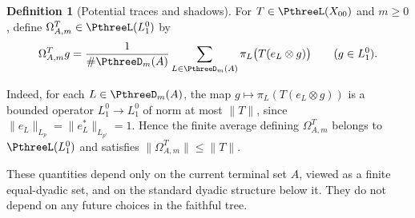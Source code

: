 \documentclass[11pt,reqno]{amsart}
\makeatletter
\theoremstyle{plain}
\theoremstyle{definition}
\newtheorem{definition}[definition]{Definition}
\newcounter{problempaper}
\newenvironment{problempaperbody}{%
  \setcounter{subsection}{0}%
  \setcounter{subsubsection}{0}%
  \setcounter{paragraph}{0}%
  \renewcommand{\thesubsection}{\arabic{subsection}}%
  \renewcommand{\thesubsubsection}{\thesubsection.\arabic{subsubsection}}%
  \renewcommand{\theparagraph}{\thesubsubsection.\arabic{paragraph}}%
  \let\problem@outersection\section
  \let\problem@outersubsection\subsection
  \let\problem@outersubsubsection\subsubsection
  \let\problem@outerparagraph\paragraph
  \let\section\problem@papersection
  \let\subsection\problem@papersubsection
  \let\subsubsection\problem@papersubsubsection
}{%
  \let\section\problem@outersection
  \let\subsection\problem@outersubsection
  \let\subsubsection\problem@outersubsubsection
  \let\paragraph\problem@outerparagraph
}
\newcommand{\problem@target}[2]{%
  \hypertarget{problem-\theproblempaper-#1-#2}{}%
}
\newcommand{\problem@paperheading}[3]{%
  \par\bigskip
  \problem@target{#1}{#2}%
  \noindent{\large\bfseries #2.\quad #3\par}%
  \nobreak\smallskip
}
\newcommand{\problem@papersubheading}[3]{%
  \par\medskip
  \problem@target{#1}{#2}%
  \noindent{\normalsize\bfseries #2.\quad #3\par}%
  \nobreak\smallskip
}
\newcommand{\problem@papersubsubheading}[3]{%
  \par\smallskip
  \problem@target{#1}{#2}%
  \noindent{\normalsize\itshape #2.\quad #3.\ }%
}
\def\problem@papersection{%
  \@ifstar{\problem@papersectionstar}{\problem@papersectionnostar}%
}
\def\problem@papersectionstar#1{%
  \par\bigskip\noindent{\large\bfseries #1\par}\nobreak\smallskip
}
\def\problem@papersectionnostar#1{%
  \refstepcounter{subsection}%
  \setcounter{subsubsection}{0}%
  \setcounter{paragraph}{0}%
  \problem@paperheading{section}{\thesubsection}{#1}%
  \problem@writecontentsline{section}{\thesubsection}{#1}%
}
\def\problem@papersubsection{%
  \@ifstar{\problem@papersubsectionstar}{\problem@papersubsectionnostar}%
}
\def\problem@papersubsectionstar#1{%
  \par\medskip\noindent{\normalsize\bfseries #1\par}\nobreak\smallskip
}
\def\problem@papersubsectionnostar#1{%
  \refstepcounter{subsubsection}%
  \setcounter{paragraph}{0}%
  \problem@papersubheading{subsection}{\thesubsubsection}{#1}%
  \problem@writecontentsline{subsection}{\thesubsubsection}{#1}%
}
\def\problem@papersubsubsection{%
  \@ifstar{\problem@papersubsubsectionstar}{\problem@papersubsubsectionnostar}%
}
\def\problem@papersubsubsectionstar#1{%
  \par\smallskip\noindent{\normalsize\itshape #1.\ }%
}
\def\problem@papersubsubsectionnostar#1{%
  \refstepcounter{paragraph}%
  \problem@papersubsubheading{subsubsection}{\theparagraph}{#1}%
  \problem@writecontentsline{subsubsection}{\theparagraph}{#1}%
}
\newcommand{\problem@writecontentsline}[3]{%
  \begingroup
  \protected@write\@auxout{}{%
    \string\problemcontentsentry{\theproblempaper}{#1}{#2}{#3}{\thepage}%
  }%
  \endgroup
}
\newcommand{\problemcontentsentry}[5]{%
  \@ifundefined{problemcontents@#1}{%
    \expandafter\gdef\csname problemcontents@#1\endcsname{}%
  }{}%
  \expandafter\g@addto@macro\csname problemcontents@#1\endcsname{%
    \problemcontentsline{#1}{#2}{#3}{#4}{#5}%
  }%
}
\newcommand{\problemcontentslink}[4]{%
  \hyperlink{problem-#1-#2-#3}{#4}%
}
\newcommand{\problemcontentsline}[5]{%
  \ifstrequal{#2}{section}{%
    \par\noindent
    \problemcontentslink{#1}{#2}{#3}{\makebox[2.5em][l]{#3}#4}%
    \nobreak\dotfill
    \problemcontentslink{#1}{#2}{#3}{#5}\par
  }{%
    \ifstrequal{#2}{subsection}{%
      \par\noindent\hspace*{1.5em}%
      \problemcontentslink{#1}{#2}{#3}{\makebox[3.5em][l]{#3}#4}%
      \nobreak\dotfill
      \problemcontentslink{#1}{#2}{#3}{#5}\par
    }{%
      \par\noindent\hspace*{3em}%
      \problemcontentslink{#1}{#2}{#3}{\makebox[4.5em][l]{#3}#4}%
      \nobreak\dotfill
      \problemcontentslink{#1}{#2}{#3}{#5}\par
    }%
  }%
}
\makeatother
\begin{document}
\begin{problempaperbody}
\begin{definition}[Potential traces and shadows]
For $T\in\PthreeL(X_{00})$ and $m\geq0$, define $\Omega_{A,m}^T\in\PthreeL(L_1^0)$ by
\begin{equation*}
        \Omega_{A,m}^Tg = \frac1{\#\PthreeD_m(A)} \sum_{L\in\PthreeD_m(A)} \pi_L\bigl(T(e_L\otimes g)\bigr) \qquad (g\in L_1^0).
\end{equation*}
\end{definition}
Indeed, for each $L\in\PthreeD_m(A)$, the map $g\mapsto\pi_L(T(e_L\otimes g))$ is a bounded operator $L_1^0\to L_1^0$ of norm at most $\|T\|$, since $\|e_L\|_{L_p}=\|e_L^*\|_{L_{p'}}=1$. Hence the finite average defining $\Omega_{A,m}^T$ belongs to $\PthreeL(L_1^0)$ and satisfies $\|\Omega_{A,m}^T\|\leq\|T\|$.

These quantities depend only on the current terminal set $A$, viewed as a finite equal-dyadic set, and on the standard dyadic structure below it. They do not depend on any future choices in the faithful tree.


\end{problempaperbody}
\end{document}
